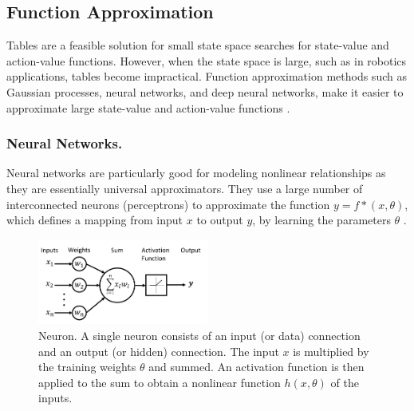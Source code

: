 

\subsection{Function Approximation}\label{chap2:function-approx}
Tables are a feasible solution for small state space searches for state-value and action-value functions. However, when the state space is large, such as in robotics applications, tables become impractical. 
Function approximation methods such as Gaussian processes, neural networks, and deep neural networks, make it easier to approximate large state-value and action-value functions \cite{sutton2018reinforcement}.



\subsubsection{Neural Networks.}
Neural networks are particularly good for modeling nonlinear relationships as they are essentially universal approximators.
They use a large number of interconnected neurons (perceptrons) to approximate the function $y = f*(x, \theta)$, which defines a mapping from input $x$ to output $y$, by learning the parameters $\theta$ \cite{eriksson2021deep}.

\begin{figure}[!ht]
    \centering
    \includegraphics[width=0.5\textwidth]{images/neuron.png}
    \caption{Neuron. A single neuron consists of an input (or data) connection and an output (or hidden) connection. The input $x$ is multiplied by the training weights $\theta$ and summed. An activation function is then applied to the sum to obtain a nonlinear function $h(x,\theta)$ of the inputs.}
    \label{fig:neuron}
\end{figure}


